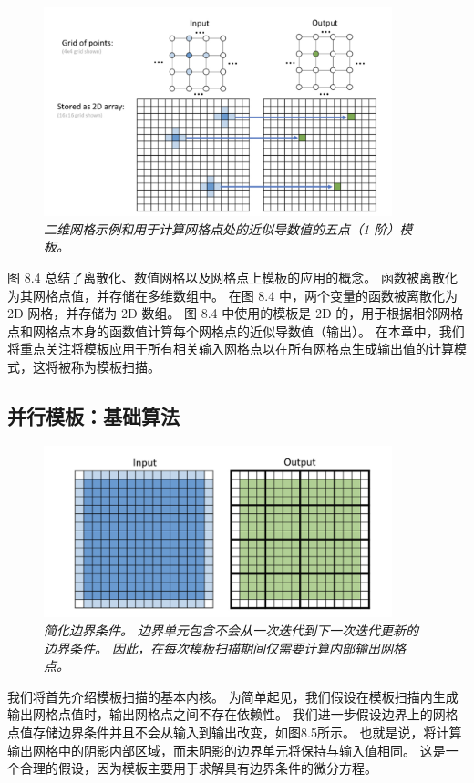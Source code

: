 \begin{figure}[H]
	\centering
	\includegraphics[width=0.9\textwidth]{figs/F8.4.png}
	\caption{\textit{二维网格示例和用于计算网格点处的近似导数值的五点（1 阶）模板。}}
\end{figure}

图 8.4 总结了离散化、数值网格以及网格点上模板的应用的概念。 函数被离散化为其网格点值，并存储在多维数组中。 
在图 8.4 中，两个变量的函数被离散化为 2D 网格，并存储为 2D 数组。 
图 8.4 中使用的模板是 2D 的，用于根据相邻网格点和网格点本身的函数值计算每个网格点的近似导数值（输出）。 
在本章中，我们将重点关注将模板应用于所有相关输入网格点以在所有网格点生成输出值的计算模式，这将被称为模板扫描。

\subsection{并行模板：基础算法}
\begin{figure}[H]
	\centering
	\includegraphics[width=0.9\textwidth]{figs/F8.5.png}
	\caption{\textit{简化边界条件。 边界单元包含不会从一次迭代到下一次迭代更新的边界条件。 
	因此，在每次模板扫描期间仅需要计算内部输出网格点。}}
\end{figure}

我们将首先介绍模板扫描的基本内核。 为简单起见，我们假设在模板扫描内生成输出网格点值时，输出网格点之间不存在依赖性。 
我们进一步假设边界上的网格点值存储边界条件并且不会从输入到输出改变，如图8.5所示。 
也就是说，将计算输出网格中的阴影内部区域，而未阴影的边界单元将保持与输入值相同。 
这是一个合理的假设，因为模板主要用于求解具有边界条件的微分方程。

